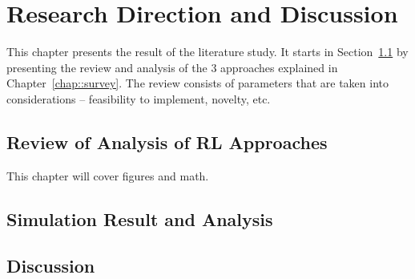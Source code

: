 \chapter{Research Direction and Discussion}

This chapter presents the result of the literature study. It starts in Section~\ref*{sec:review} by presenting the review and analysis of the 3 approaches explained in Chapter~\ref{chap::survey}. The review consists of parameters that are taken into considerations -- feasibility to implement, novelty, etc. 
\section{Review of Analysis of \ac {RL} Approaches} \label{sec:review}
This chapter will cover figures and math. 

\section{Simulation Result and Analysis}

\section{Discussion}

